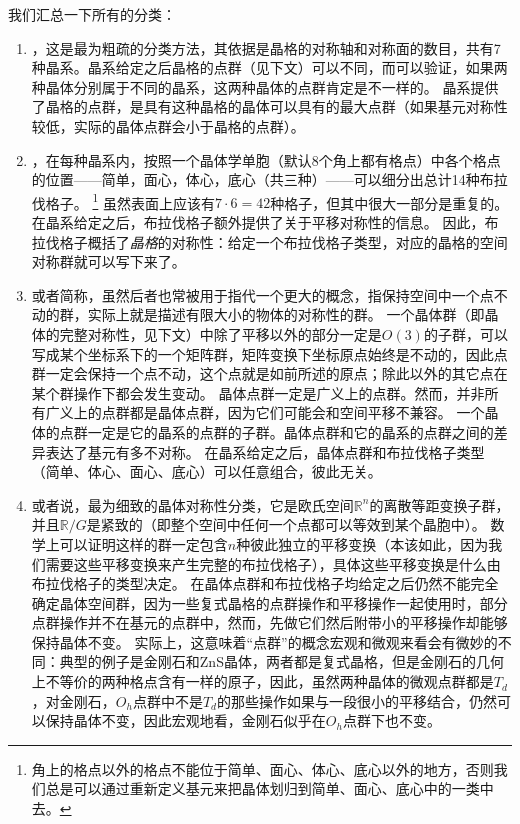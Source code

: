我们汇总一下所有的分类：
\begin{enumerate}
    \item {}，这是最为粗疏的分类方法，其依据是晶格的对称轴和对称面的数目，共有7种晶系。晶系给定之后晶格的点群（见下文）可以不同，而可以验证，如果两种晶体分别属于不同的晶系，这两种晶体的点群肯定是不一样的。
    晶系提供了晶格的点群，是具有这种晶格的晶体可以具有的最大点群（如果基元对称性较低，实际的晶体点群会小于晶格的点群）。
    \item {}，在每种晶系内，按照一个晶体学单胞（默认8个角上都有格点）中各个格点的位置——简单，面心，体心，底心（共三种）——可以细分出总计14种布拉伐格子。%
    \footnote{
        角上的格点以外的格点不能位于简单、面心、体心、底心以外的地方，否则我们总是可以通过重新定义基元来把晶体划归到简单、面心、底心中的一类中去。
    }%
    虽然表面上应该有$7 \cdot 6 = 42$种格子，但其中很大一部分是重复的。
    在晶系给定之后，布拉伐格子额外提供了关于平移对称性的信息。
    因此，布拉伐格子概括了\emph{晶格}的对称性：给定一个布拉伐格子类型，对应的晶格的空间对称群就可以写下来了。
    \item {}或者简称，虽然后者也常被用于指代一个更大的概念，指保持空间中一个点不动的群，实际上就是描述有限大小的物体的对称性的群。
    一个晶体群（即晶体的完整对称性，见下文）中除了平移以外的部分一定是$O(3)$的子群，可以写成某个坐标系下的一个矩阵群，矩阵变换下坐标原点始终是不动的，因此点群一定会保持一个点不动，这个点就是如前所述的原点；除此以外的其它点在某个群操作下都会发生变动。
    晶体点群一定是广义上的点群。然而，并非所有广义上的点群都是晶体点群，因为它们可能会和空间平移不兼容。
    一个晶体的点群一定是它的晶系的点群的子群。晶体点群和它的晶系的点群之间的差异表达了基元有多不对称。
    在晶系给定之后，晶体点群和布拉伐格子类型（简单、体心、面心、底心）可以任意组合，彼此无关。
    \item {}或者说，最为细致的晶体对称性分类，它是欧氏空间$\mathbb{R}^n$的离散等距变换子群，并且$\mathbb{R} / G$是紧致的（即整个空间中任何一个点都可以等效到某个晶胞中）。
    数学上可以证明这样的群一定包含$n$种彼此独立的平移变换（本该如此，因为我们需要这些平移变换来产生完整的布拉伐格子），具体这些平移变换是什么由布拉伐格子的类型决定。
    在晶体点群和布拉伐格子均给定之后仍然不能完全确定晶体空间群，因为一些复式晶格的点群操作和平移操作一起使用时，部分点群操作并不在基元的点群中，然而，先做它们然后附带小的平移操作却能够保持晶体不变。
    实际上，这意味着“点群”的概念宏观和微观来看会有微妙的不同：典型的例子是金刚石和ZnS晶体，两者都是复式晶格，但是金刚石的几何上不等价的两种格点含有一样的原子，因此，虽然两种晶体的微观点群都是$T_d$，对金刚石，$O_h$点群中不是$T_d$的那些操作如果与一段很小的平移结合，仍然可以保持晶体不变，因此宏观地看，金刚石似乎在$O_h$点群下也不变。
\end{enumerate}

